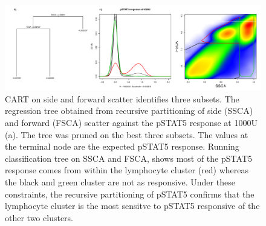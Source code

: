 \begin{figure}[h]
\centering
\includegraphics[scale=.45]{IL2/figures/pstat5-response-decision-tree.pdf}
{ \gls{CART} on side and forward scatter identifies three subsets. }
{
The regression tree obtained from recursive partitioning of side (SSCA) and forward (FSCA) scatter against the pSTAT5 response at 1000U (a).
The tree was pruned on the best three subsets.
The values at the terminal node are the expected pSTAT5 response.
Running classification tree on SSCA and FSCA, shows most of the pSTAT5 response comes from within the lymphocyte cluster (red) whereas
the black and green cluster are not as responsive.
Under these constraints, the recursive partitioning of pSTAT5 confirms that the lymphocyte cluster is the most sensitve to pSTAT5 responsive
of the other two clusters.
}
\end{figure}

